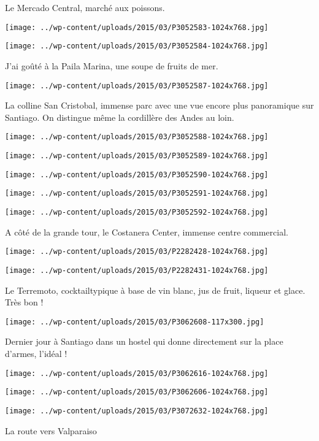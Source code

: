 Le Mercado Central, marché aux poissons. \newline
\centerline{\texttt{[image: ../wp-content/uploads/2015/03/P3052583-1024x768.jpg]} } 
 \newline
\centerline{\texttt{[image: ../wp-content/uploads/2015/03/P3052584-1024x768.jpg]} } 
J'ai goûté à la Paila Marina, une soupe de fruits de mer. \newline
\centerline{\texttt{[image: ../wp-content/uploads/2015/03/P3052587-1024x768.jpg]} } 
La colline San Cristobal, immense parc avec une vue encore plus panoramique sur Santiago. On distingue même la cordillère des Andes au loin. \newline
\centerline{\texttt{[image: ../wp-content/uploads/2015/03/P3052588-1024x768.jpg]} } 
 \newline
\centerline{\texttt{[image: ../wp-content/uploads/2015/03/P3052589-1024x768.jpg]} } 
 \newline
\centerline{\texttt{[image: ../wp-content/uploads/2015/03/P3052590-1024x768.jpg]} } 
 \newline
\centerline{\texttt{[image: ../wp-content/uploads/2015/03/P3052591-1024x768.jpg]} } 
 \newline
\centerline{\texttt{[image: ../wp-content/uploads/2015/03/P3052592-1024x768.jpg]} } 
A côté de la grande tour, le Costanera Center, immense centre commercial. \newline
\centerline{\texttt{[image: ../wp-content/uploads/2015/03/P2282428-1024x768.jpg]} } 
 \newline
\centerline{\texttt{[image: ../wp-content/uploads/2015/03/P2282431-1024x768.jpg]} } 
 Le Terremoto, cocktailtypique à base de vin blanc, jus de fruit, liqueur et glace. Très bon ! \newline
\centerline{\texttt{[image: ../wp-content/uploads/2015/03/P3062608-117x300.jpg]} } 
 Dernier jour à Santiago dans un hostel qui donne directement sur la place d'armes, l'idéal ! \newline
\centerline{\texttt{[image: ../wp-content/uploads/2015/03/P3062616-1024x768.jpg]} } 
 \newline
\centerline{\texttt{[image: ../wp-content/uploads/2015/03/P3062606-1024x768.jpg]} } 
 \newline
\centerline{\texttt{[image: ../wp-content/uploads/2015/03/P3072632-1024x768.jpg]} } 
  La route vers Valparaiso \newline
